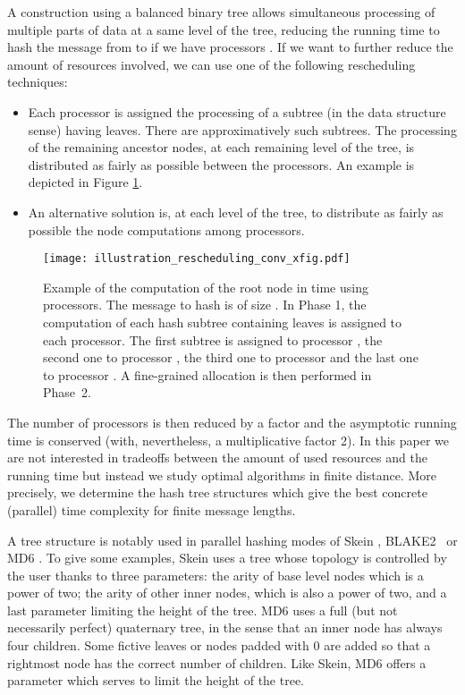 \documentclass{llncs}
\begin{document}
A construction using a balanced binary tree allows simultaneous processing of multiple parts of data 
at a same level of the tree, 
reducing the running time to hash the message from  to  
if we have  processors \cite{Dam90,Mer80}. If we want to further reduce
the amount of resources involved, we can use one of the following rescheduling techniques:
\begin{itemize}
 \item Each processor is assigned the processing of a subtree (in the data structure sense) having  leaves. 
 There are approximatively  such subtrees. 
The processing of the remaining ancestor nodes, at each remaining level of the tree, is distributed as fairly as possible
between the processors. An example is depicted in Figure \ref{resch_technique}.

 \item An alternative solution is, at each level of the tree, to distribute as fairly as possible the node computations among
 processors.
\end{itemize}

\begin{figure}[htbp]
\begin{center}
\texttt{[image: illustration\_rescheduling\_conv\_xfig.pdf]}
\caption{Example of the computation of the root node in  time using  processors. The message
to hash is of size . In Phase 1, the computation of each hash subtree containing  leaves is assigned to each processor. The first 
subtree is assigned to processor , the second one to processor , the third one to processor  and the last one to processor . A fine-grained allocation
is then performed in Phase~2.}
\label{resch_technique}
\end{center}
\end{figure}

The number of processors is then reduced by a factor  and
the asymptotic running time is conserved (with, nevertheless, a multiplicative factor 2).
In this paper we are not interested in tradeoffs between
the amount of used resources and the running time but instead we study optimal algorithms in finite distance.
More precisely, we determine the hash tree structures which give the best concrete (parallel) time complexity for finite message lengths.


A tree structure is notably used in parallel hashing modes of Skein \cite{FLSWBKCW09}, BLAKE2~\cite{ANWW13} or MD6 \cite{RABCDEKKLRSSSTY08}. 
To give some examples, Skein uses a tree whose topology is controlled by the user thanks to three parameters:
the arity of base level nodes which is a power of two; the arity of other inner nodes,
which is also a power of two, and a last parameter limiting the height of the tree.
MD6 uses a full (but not necessarily perfect) quaternary tree, in the sense that an inner node has always four children.
Some fictive leaves or nodes padded with 0 are added so that a rightmost node has the correct number of children. 
Like Skein, MD6 offers a parameter which serves to limit the height of the tree.
\end{document}
